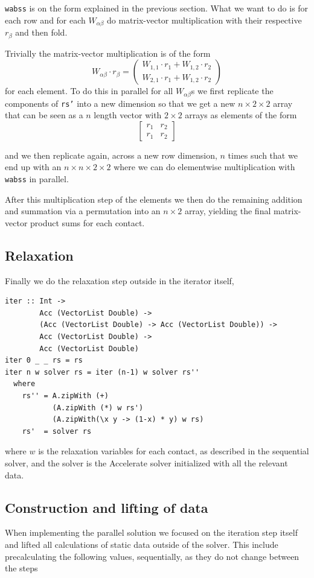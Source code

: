 \documentclass[runningheads,a4paper]{llncs}
\begin{document}
\texttt{wabss} is on the form explained in the previous section.
What we want to do is for each row and for each $W_{\alpha\beta}$
do matrix-vector multiplication with their respective $r_\beta$
and then fold.

Trivially the matrix-vector multiplication is of the form
\[
W_{\alpha\beta} \cdot r_\beta = 
\begin{pmatrix}
W_{1,1} \cdot r_{1} + W_{1,2} \cdot r_{2} \\
W_{2,1} \cdot r_{1} + W_{1,2} \cdot r_{2}
\end{pmatrix}
\]
for each element.
To do this in parallel for all $W_{\alpha\beta}$s
we first replicate the components of \texttt{rs'}
into a new dimension so that we get a new $n \times 2 \times 2$
array that can be seen as a $n$ length vector with $2 \times 2$
arrays as elements of the form
\[
\begin{bmatrix}
r_{1} & r_{2} \\
r_{1} & r_{2}
\end{bmatrix}
\]

and we then replicate again, across a new row dimension,
$n$ times such that we end up with an $n \times n \times 2 \times 2$
where we can do elementwise multiplication with \texttt{wabss} in parallel.

After this multiplication step of the elements we then do the remaining addition and summation
via a permutation into an $n \times 2$ array, yielding the final matrix-vector product sums
for each contact.

\subsection{Relaxation}
Finally we do the relaxation step outside in the iterator itself,
\begin{verbatim}
iter :: Int ->
        Acc (VectorList Double) ->
        (Acc (VectorList Double) -> Acc (VectorList Double)) ->
        Acc (VectorList Double) ->
        Acc (VectorList Double)
iter 0 _ _ rs = rs
iter n w solver rs = iter (n-1) w solver rs''
  where
    rs'' = A.zipWith (+)
           (A.zipWith (*) w rs')
           (A.zipWith(\x y -> (1-x) * y) w rs)
    rs'  = solver rs
\end{verbatim}
where $w$ is the relaxation variables for each contact,
as described in the sequential solver,
and the solver is the Accelerate solver initialized
with all the relevant data.

\subsection{Construction and lifting of data}
When implementing the parallel solution
we focused on the iteration step itself
and lifted all calculations of static data
outside of the solver.
This include precalculating the following values,
sequentially, as they do not change between the steps
\end{document}
